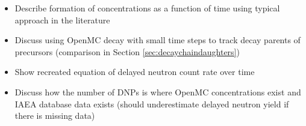 \begin{itemize}
    \item Describe formation of concentrations as a function of time using typical approach in the literature
    \item Discuss using OpenMC decay with small time steps to track decay parents of precursors (comparison in Section \ref{sec:decaychaindaughters})
    \item Show recreated equation of delayed neutron count rate over time
    \item Discuss how the number of \glspl{DNP} is where OpenMC concentrations exist and IAEA database data exists (should underestimate delayed neutron yield if there is missing data)
\end{itemize}

